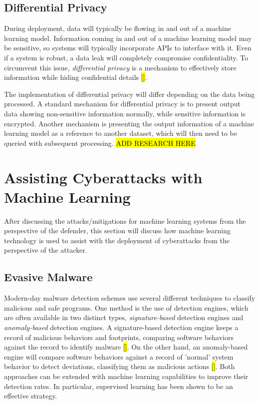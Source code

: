 \documentclass[11pt,conference]{IEEEtran}
\begin{document}
\subsection{Differential Privacy}
During deployment, data will typically be flowing in and out of a machine
learning model. Information coming in and out of a machine learning model may be sensitive, so
systems will typically incorporate APIs to interface with it. Even if a system
is robust, a data leak will completely compromise confidentiality. To
circumvent this issue, \emph{differential privacy} is a mechanism to
effectively store
information while hiding confidential details \hl{[]}.

The implementation of differential privacy will differ depending on the data
being processed. A standard mechanism for differential privacy is to present
output data showing non-sensitive information normally, while sensitive
information is encrypted. Another mechanism is presenting the output
information of a machine learning model as a reference to another dataset, which
will then need to be queried with subsequent processing.
\hl{ADD RESEARCH HERE}

\section{Assisting Cyberattacks with Machine Learning}
After discussing the attacks/mitigations for machine learning systems
from the perspective of the defender, this section will discuss how machine
learning technology is used to assist with the deployment of cyberattacks from
the perspective of the attacker.

\subsection{Evasive Malware}
Modern-day malware detection schemes use several different techniques to
classify malicious and safe programs. One method is the use of detection
engines, which are often available in two distinct types,
\emph{signature-based} detection engines and \emph{anomaly-based} detection
engines. A signature-based detection engine keeps a record of malicious
behaviors and footprints, comparing software behaviors against the record to
identify malware \hl{[]}. On the other hand, an anomaly-based engine will
compare software behaviors against a record of 'normal' system behavior to
detect deviations, classifying them as malicious actions \hl{[]}. Both approaches can be extended with machine learning
capabilities to improve their detection rates. In particular, supervised
learning has been shown to be an effective strategy.
\end{document}
